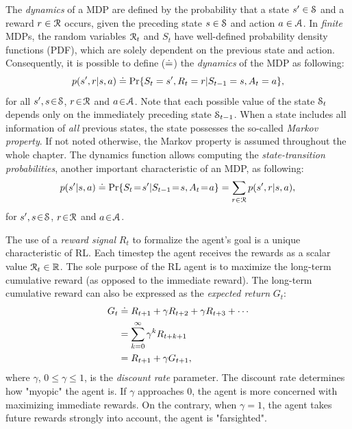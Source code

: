 \documentclass[a4paper, twoside, 12pt]{article}
\begin{document}
The \emph{dynamics} of a MDP are defined by the probability that a state \(s'\in \S\)
and a reward \(r\in\R\) occurs, given the preceding state \(s\in\S\) and action
\(a\in\A\). In \emph{finite} MDPs, the random variables \(\R_t\) and \(S_t\) have
well-defined probability density functions (PDF), which are solely dependent on
the previous state and action. Consequently, it is possible to define (\(\defeq\))
the \emph{dynamics} of the MDP as following:
\begin{equation}
    p(s',r|s,a) \defeq \Pr{S_t=s',R_t=r|S_{t-1}=s,A_t=a},
\end{equation}
for all \(s',s\!\in\!\S\), \(r\!\in\!\R\) and \(a\!\in\!\A\). Note that each possible
value of the state \(\S_t\) depends only on the immediately preceding state
\(\S_{t-1}\). When a state includes all information of \emph{all} previous states, the
state possesses the so-called \emph{Markov property}. If not noted otherwise, the
Markov property is assumed throughout the whole chapter. The dynamics function
allows computing the \emph{state-transition probabilities}, another important
characteristic of an MDP, as following:
\begin{equation}
    p(s'|s,a) \defeq \Pr{S_t\!=\!s'|S_{t-1}\!=\!s,A_t\!=\!a} = \sum_{r\in\R}{p(s', r|s, a)},
\end{equation}
for \(s',s\!\in\!\S\), \(r\!\in\!\R\) and \(a\!\in\!\A\).

The use of a \emph{reward signal} \(R_t\) to formalize the agent's goal is a unique
characteristic of RL. Each timestep the agent receives the rewards as a scalar
value \(\R_t\in\Re\). The sole purpose of the RL agent is to maximize the
long-term cumulative reward (as opposed to the immediate reward). The long-term
cumulative reward can also be expressed as the \emph{expected return} \(G_t\):
\begin{equation} \label{eq-expected-return}
\begin{split}
    G_t &\defeq R_{t+1} + \gamma R_{t+2} + \gamma R_{t+3} + \cdots \\
    &= \sum_{k=0}^{\infty}{\gamma^k R_{t+k+1}} \\
    &= R_{t+1} + \gamma G_{t+1},
\end{split}
\end{equation}
where \(\gamma\), \(0\leq\gamma\leq 1\), is the \emph{discount rate} parameter. The
discount rate determines how "myopic" the agent is. If \(\gamma\) approaches 0,
the agent is more concerned with maximizing immediate rewards. On the contrary,
when \(\gamma\!=\! 1\), the agent takes future rewards strongly into account, the
agent is "farsighted".
\end{document}
